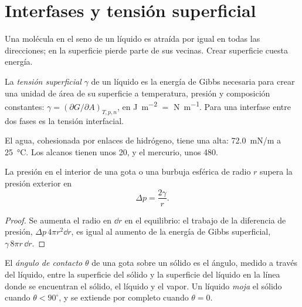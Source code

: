 \section{Interfases y tensión superficial}

Una molécula en el seno de un líquido es atraída por igual en todas las direcciones; en
la superficie pierde parte de sus vecinas. Crear superficie cuesta energía.

\begin{definition}\label{def:b3:colloids:surface-tension}
La \emph{tensión superficial} $\gamma$ de un líquido es la energía de
Gibbs necesaria para crear una unidad de área de su superficie a temperatura, presión y
composición constantes: $\gamma = (\partial G/\partial A)_{T,p,n}$, en \unit{J.m^{-2}} $=$ \unit{N.m^{-1}}. Para una
interfase entre dos fases es la tensión interfacial.
\end{definition}

El agua, cohesionada por enlaces de hidrógeno, tiene una  alta: \qty{72.0}{mN/m}
a \qty{25}{\celsius}. Los alcanos tienen unos 20, y el mercurio, unos 480.

\begin{proposition}\label{prop:b3:colloids:laplace}
La presión en el interior de una gota o una burbuja esférica de radio $r$ supera la
presión exterior en
\[
  \Delta p = \frac{2\gamma}{r} .
\]
\end{proposition}

\begin{proof}
Se aumenta el radio en $\dd r$ en el equilibrio: el trabajo de la diferencia de
presión, $\Delta p\,4\pi r^2\dd r$, es igual al aumento de la energía de Gibbs superficial, $\gamma\,8\pi r\,\dd r$.
\end{proof}

\begin{definition}\label{def:b3:colloids:wetting}
El \emph{ángulo de contacto} $\theta$ de una gota sobre un sólido es el ángulo,
medido a través del líquido, entre la superficie del sólido y la superficie del líquido
en la línea donde se encuentran el sólido, el líquido y el vapor. Un líquido \emph{moja}
el sólido cuando $\theta < 90^\circ$, y se extiende por completo cuando $\theta = 0$.
\end{definition}

